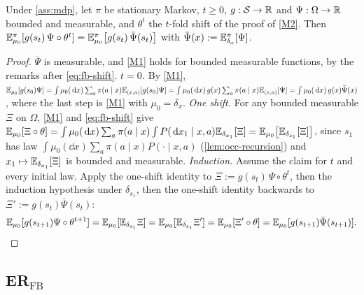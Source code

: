 \begin{lemma}\label{lem:fbil-markov}
Under \cref{ass:mdp}, let $\pi$ be stationary Markov, $t\ge0$, $g:\mathcal{S}\to\mathbb{R}$ and $\Psi:\Omega\to\mathbb{R}$ bounded and measurable, and $\theta^t$ the $t$-fold shift of the proof of \ref{M2}. Then
$\mathbb{E}^\pi_{\mu_0}[g(s_t)\,\Psi\circ\theta^t]=\mathbb{E}^\pi_{\mu_0}\big[g(s_t)\,\bar\Psi(s_t)\big]$ with $\bar\Psi(x):=\mathbb{E}^\pi_{\delta_x}[\Psi]$.
\end{lemma}
\begin{proof}
$\bar\Psi$ is measurable, and \ref{M1} holds for bounded measurable functions, by the remarks after \eqref{eq:fb-shift}.
\emph{$t=0$.} By \ref{M1}, $\mathbb{E}_{\mu_0}[g(s_0)\Psi]=\int\mu_0(\,\mathrm{d} x)\sum_a\pi(a\mid x)\mathbb{E}_{(x,a)}[g(s_0)\Psi]=\int\mu_0(\,\mathrm{d} x)\,g(x)\sum_a\pi(a\mid x)\mathbb{E}_{(x,a)}[\Psi]=\int\mu_0(\,\mathrm{d} x)\,g(x)\bar\Psi(x)$, where the last step is \ref{M1} with $\mu_0=\delta_x$.
\emph{One shift.} For any bounded measurable $\Xi$ on $\Omega$, \ref{M1} and \eqref{eq:fb-shift} give
$\mathbb{E}_{\mu_0}[\Xi\circ\theta]=\int\mu_0(\,\mathrm{d} x)\sum_a\pi(a\mid x)\int P(\,\mathrm{d} x_1\mid x,a)\mathbb{E}_{\delta_{x_1}}[\Xi]=\mathbb{E}_{\mu_0}\big[\mathbb{E}_{\delta_{s_1}}[\Xi]\big]$, since $s_1$ has law $\int\mu_0(\dd x)\sum_a\pi(a\mid x)P(\cdot\mid x,a)$ (\cref{lem:occ-recursion}) and $x_1\mapsto\mathbb{E}_{\delta_{x_1}}[\Xi]$ is bounded and measurable.
\emph{Induction.} Assume the claim for $t$ and every initial law. Apply the one-shift identity to $\Xi:=g(s_t)\,\Psi\circ\theta^t$, then the induction hypothesis under $\delta_{s_1}$, then the one-shift identity backwards to $\Xi':=g(s_t)\bar\Psi(s_t)$:
\[
\mathbb{E}_{\mu_0}[g(s_{t+1})\Psi\circ\theta^{t+1}]=\mathbb{E}_{\mu_0}[\mathbb{E}_{\delta_{s_1}}\Xi]=\mathbb{E}_{\mu_0}[\mathbb{E}_{\delta_{s_1}}\Xi']=\mathbb{E}_{\mu_0}[\Xi'\circ\theta]=\mathbb{E}_{\mu_0}[g(s_{t+1})\bar\Psi(s_{t+1})].\qedhere
\]
\end{proof}

\subsection{\texorpdfstring{ER$_{\mathrm{FB}}$}{ER-FB}}\label{sec:fbil-er}

